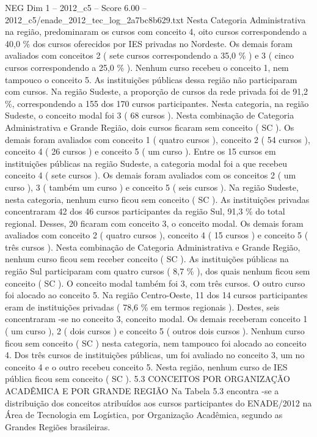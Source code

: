 \begin{textsample}{NEG Dim 1 – 2012\_c5 – Score 6.00 – 2012\_c5/enade\_2012\_tec\_log\_2a7bc8b629.txt}
Nesta Categoria Administrativa na região, predominaram os cursos com conceito 4, oito cursos correspondendo a 40,0 \% dos cursos oferecidos por IES privadas no Nordeste.
Os demais foram avaliados com conceitos 2 ( sete cursos correspondendo a 35,0 \% ) e 3 ( cinco cursos correspondendo a 25,0 \% ).
Nenhum curso recebeu o conceito 1, nem tampouco o conceito 5.
As instituições públicas dessa região não participaram com cursos.
Na região Sudeste, a proporção de cursos da rede privada foi de 91,2 \%, correspondendo a 155 dos 170 cursos participantes.
Nesta categoria, na região Sudeste, o conceito modal foi 3 ( 68 cursos ).
Nesta combinação de Categoria Administrativa e Grande Região, dois cursos ficaram sem conceito ( SC ).
Os demais foram avaliados com conceito 1 ( quatro cursos ), conceito 2 ( 54 cursos ), conceito 4 ( 26 cursos ) e conceito 5 ( um curso ).
Entre os 15 cursos em instituições públicas na região Sudeste, a categoria modal foi a que recebeu conceito 4 ( sete cursos ).
Os demais foram avaliados com os conceitos 2 ( um curso ), 3 ( também um curso ) e conceito 5 ( seis cursos ).
Na região Sudeste, nesta categoria, nenhum curso ficou sem conceito ( SC ).
As instituições privadas concentraram 42 dos 46 cursos participantes da região Sul, 91,3 \% do total regional.
Desses, 20 ficaram com conceito 3, o conceito modal.
Os demais foram avaliados com conceito 2 ( quatro cursos ), conceito 4 ( 15 cursos ) e conceito 5 ( três cursos ).
Nesta combinação de Categoria Administrativa e Grande Região, nenhum curso ficou sem receber conceito ( SC ).
As instituições públicas na região Sul participaram com quatro cursos ( 8,7 \% ), dos quais nenhum ficou sem conceito ( SC ).
O conceito modal também foi 3, com três cursos.
O outro curso foi alocado ao conceito 5.
Na região Centro-Oeste, 11 dos 14 cursos participantes eram de instituições privadas ( 78,6 \% em termos regionais ).
Destes, seis concentraram -se no conceito 3, conceito modal.
Os demais receberam conceito 1 ( um curso ), 2 ( dois cursos ) e conceito 5 ( outros dois cursos ).
Nenhum curso ficou sem conceito ( SC ) nesta categoria, nem tampouco foi alocado ao conceito 4.
Dos três cursos de instituições públicas, um foi avaliado no conceito 3, um no conceito 4 e o outro recebeu conceito 5.
Nesta região, nenhum curso de IES pública ficou sem conceito ( SC ). 5.3 CONCEITOS POR ORGANIZAÇÃO ACADÊMICA E POR GRANDE REGIÃO Na Tabela 5.3 encontra -se a distribuição dos conceitos atribuídos aos cursos participantes do ENADE/2012 na Área de Tecnologia em Logística, por Organização Acadêmica, segundo as Grandes Regiões brasileiras.

\end{textsample}
